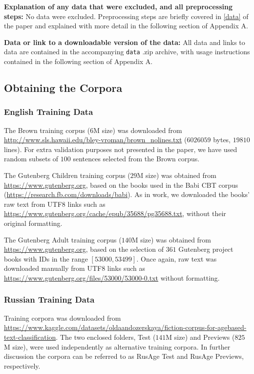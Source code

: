 \documentclass[11pt]{article}
\begin{document}
\textbf{Explanation of any data that were excluded, and all preprocessing steps:} No data were excluded. Preprocessing steps are briefly covered in \autoref{data} of the paper and explained with more detail in the following section of Appendix A. 

\textbf{Data or link to a downloadable version of the data:} All data and links to data are contained in the accompanying \texttt{data} .zip archive, with usage instructions contained in the following section of Appendix A.

\subsection{Obtaining the Corpora}

\subsubsection{English Training Data}

The Brown training corpus ($6$M size) was downloaded from \url{http://www.sls.hawaii.edu/bley-vroman/brown_nolines.txt} ($6026059$ bytes,  $19810$ lines). For extra validation purposes not presented in the paper, we have used random subsets of $100$ sentences selected from the Brown corpus.

The Gutenberg Children training corpus ($29$M size) was obtained from \url{https://www.gutenberg.org}, based on the books used in the Babi CBT corpus (\url{https://research.fb.com/downloads/babi}). As in  work, we downloaded the books’ raw text from UTF8 links such as \url{https://www.gutenberg.org/cache/epub/35688/pg35688.txt}, without their original formatting.

The Gutenberg Adult training corpus ($140$M size) was obtained from \url{https://www.gutenberg.org}, based on the selection of $361$ Gutenberg project books with IDs in the range $[53000,53499]$. Once again, raw text was downloaded manually from UTF8 links such as \url{https://www.gutenberg.org/files/53000/53000-0.txt} without formatting.

\subsubsection{Russian Training Data}

Training corpora was downloaded from \url{https://www.kaggle.com/datasets/oldaandozerskaya/fiction-corpus-for-agebased-text-classification}. The two enclosed folders, Test ($141$M size) and Previews ($825$M size), were used independently as alternative training corpora. In further discussion the corpora can be referred to as RusAge Test and RusAge Previews, respectively.
\end{document}
